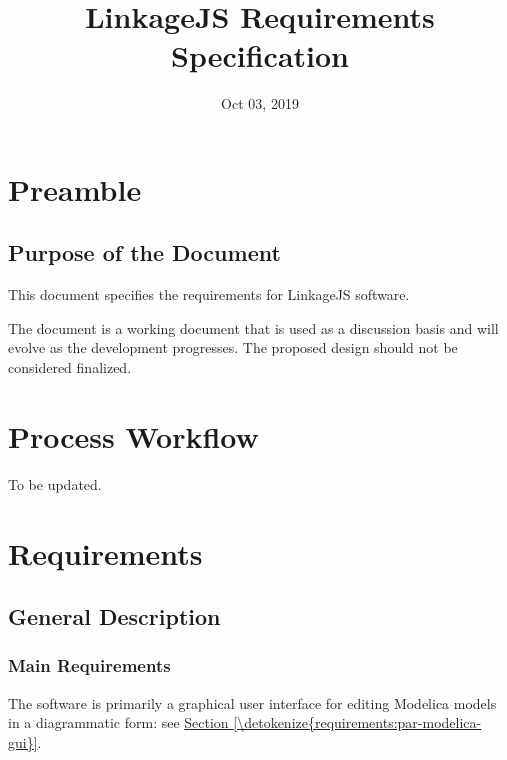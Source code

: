 \documentclass[letterpaper,10pt, openany,english]{sphinxmanual}
\title{LinkageJS Requirements Specification}
\date{Oct 03, 2019}
\author{}
\begin{document}
\pagestyle{empty}
\sphinxmaketitle
\pagestyle{plain}
\sphinxtableofcontents
\pagestyle{normal}
\label{\detokenize{index::doc}}


\pagestyle{plain}


\chapter{Preamble}
\label{\detokenize{preamble:preamble}}\label{\detokenize{preamble::doc}}

\section{Purpose of the Document}
\label{\detokenize{preamble:purpose-of-the-document}}
This document specifies the requirements for LinkageJS software.

The document is a working document that is used as a discussion basis and will evolve as the development progresses.
The proposed design should not be considered finalized.


\chapter{Process Workflow}
\label{\detokenize{process:process-workflow}}\label{\detokenize{process:sec-process}}\label{\detokenize{process::doc}}
To be updated.


\chapter{Requirements}
\label{\detokenize{requirements:requirements}}\label{\detokenize{requirements:sec-requirements}}\label{\detokenize{requirements::doc}}

\section{General Description}
\label{\detokenize{requirements:general-description}}\label{\detokenize{requirements:par-general-description}}

\subsection{Main Requirements}
\label{\detokenize{requirements:main-requirements}}
The software is primarily a graphical user interface for editing Modelica models in a diagrammatic form: see \hyperref[\detokenize{requirements:par-modelica-gui}]{Section \ref{\detokenize{requirements:par-modelica-gui}}}.
\end{document}
